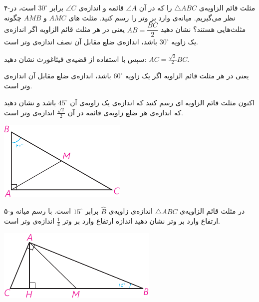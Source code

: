 \documentclass[12pt, a4paper]{book}
\newenvironment{Figure}
{\par\medskip\noindent\minipage{\linewidth}}
{\endminipage\par\medskip}
\begin{document}
\begin{multicols}{2}
			\bigskip
			{\medium ۴-}مثلث قائم الزاویه‌ی 
			$\triangle ABC$
			را که در آن 
			$\angle A$
			قائمه و اندازه‌ی
			$\angle C$
			برابر 
			$30^{\circ}$
			است، در نظر می‌گیریم. میانه‌ی وارد بر وتر را رسم کنید. مثلث های 
			$AMC$
			و
			$AMB$
			چگونه مثلث‌هایی هستند؟ نشان دهید 
			$AB = \dfrac{BC}{2}$
			یعنی در هر مثلث قائم الزاویه اگر اندازه‌ی یک زاویه 
			$30^{\circ}$
			باشد، اندازه‌ی ضلع مقابل آن نصف اندازه‌ی وتر است.
			
			سپس با استفاده از قضیه‌ی فیثاغورث نشان دهید: 
			$AC = \frac{\sqrt{3}}{2}BC$.
			
			یعنی در هر مثلث قائم الزاویه اگر یک زاویه 
			$60^{\circ}$
			باشد، اندازه‌ی ضلع مقابل آن  اندازه‌ی وتر است.
			
			اکنون مثلث قائم الزاویه ای رسم کنید که اندازه‌ی یک زاویه‌ی آن 
			$45^{\circ}$
			باشد و نشان دهید که اندازه‌ی هر ضلع زاویه‌ی قائمه در آن 
			$\frac{\sqrt{2}}{2}$
			اندازه‌ی وتر است.

		\begin{Figure}
			\centering
			\includegraphics[scale=1.2]{"Shapes/Fasl - 3/Dars 1/PDFs/P64-S1.pdf"}
		\end{Figure}

			\bigskip
			{\medium ۵-}در مثلث قائم الزاویه‌ی 
			$\triangle ABC$
			اندازه‌ی زاویه‌ی 
			$\widehat{B}$
			برابر 
			$15^{\circ}$
			است. با رسم میانه و ارتفاع وارد بر وتر نشان دهید اندازه‌ ارتفاع وارد بر وتر 
			$\frac14$
			اندازه‌ی وتر است.
			
			\begin{Figure}
				\centering
				\includegraphics[scale=1.2]{"Shapes/Fasl - 3/Dars 1/PDFs/P64-S2.pdf"}
			\end{Figure}



\end{multicols}
\end{document}
